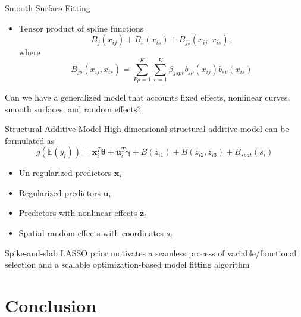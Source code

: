 \documentclass[
  ignorenonframetext,
  aspectratio=169]{beamer}
\providecommand{\tightlist}{%
  \setlength{\itemsep}{0pt}\setlength{\parskip}{0pt}}
\newcommand{\bs}[1]{\boldsymbol{#1}}
\begin{document}
\begin{frame}{Smooth Surface Fitting}
\protect\hypertarget{smooth-surface-fitting}{}
\begin{itemize}
\tightlist
\item
  Tensor product of spline functions \[
    B_j(x_{ij}) + B_s(x_{is}) + B_{js}(x_{ij}, x_{is}),
  \] where \[
  B_{js}(x_{ij}, x_{is}) = \sum\limits^K_{P\rho=1} \sum\limits^K_{v=1} \beta_{jspv} b_{j\rho}(x_{ij})b_{sv}(x_{is})
  \]
\end{itemize}

\begin{tcolorbox}[colback=green!5,colframe=green!40!black,title=Question]
  Can we have a generalized model that accounts fixed effects, nonlinear curves, smooth surfaces, and random effects?
\end{tcolorbox}
\end{frame}

\begin{frame}{Structural Additive Model}
\protect\hypertarget{structural-additive-model}{}
High-dimensional structural additive model can be formulated as \[
g(\mathbb{E}(y_i)) = \bs x_i^T \bs \theta + \bs u_i^T \bs \gamma + B(z_{i1}) + B(z_{i2}, z_{i3}) + B_{spat}(s_i)
\]

\begin{itemize}
\tightlist
\item
  Un-regularized predictors \(\bs x_i\)
\item
  Regularized predictors \(\bs u_i\)
\item
  Predictors with nonlinear effects \(\bs z_i\)
\item
  Spatial random effects with coordinates \(s_i\)
\end{itemize}

Spike-and-slab LASSO prior motivates a seamless process of
variable/functional selection and a scalable optimization-based model
fitting algorithm
\end{frame}

\hypertarget{conclusion}{%
\section{Conclusion}\label{conclusion}}
\end{document}

